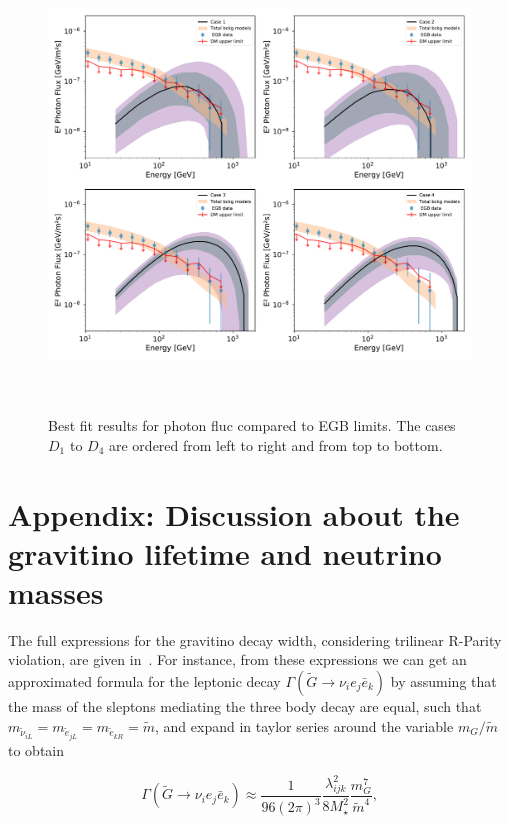 \documentclass[a4paper,11pt]{article}
\begin{document}
\begin{figure}[htb]
\begin{center}
\includegraphics[height=12cm,width=16cm,angle=0]{Figures/pymultinest_fit_case_5_gamma_rays_EGB.pdf}
\caption{Best fit results for photon fluc compared to EGB limits. The cases $D_1$ to $D_4$ are ordered from left to right and from top to bottom.}
\label{fig:bf-photon-egb-spectrum}
\end{center}
\end{figure}

\section{Appendix: Discussion about the gravitino lifetime and neutrino masses}
\label{sec:lifetime-neutrinomasses}

The full expressions for the gravitino decay width, considering trilinear
R-Parity violation, are given in~\cite{Moreau:2001sr}. For instance, from
these expressions we can get an approximated formula for the leptonic
decay $\Gamma(\tilde{G}\rightarrow\nu_{i}e_{j}\bar{e}_{k})$ by assuming
that the mass of the sleptons mediating the three body decay are
equal, such that $m_{\tilde{\nu}_{iL}}=m_{\tilde{e}_{jL}}=m_{\tilde{e}_{kR}}=\tilde{m}$,
and expand in taylor series around the variable $m_{G}/\tilde{m}$
to obtain

\begin{equation}
\Gamma(\tilde{G}\rightarrow\nu_{i}e_{j}\bar{e}_{k})\approx\frac{1}{96(2\pi)^{3}}\frac{\lambda_{ijk}^{2}}{8M_{\star}^{2}}\frac{m_{G}^{7}}{\tilde{m}^{4}},\label{eq:GravDecayApp}
\end{equation}
\end{document}
